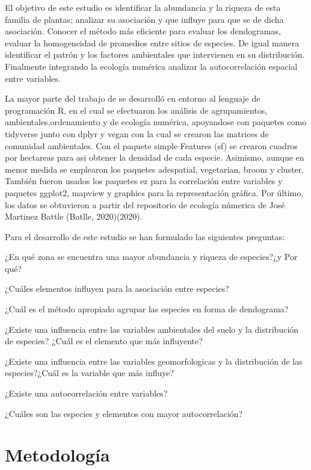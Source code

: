 \documentclass[11pt,]{article}
\begin{document}
El objetivo de este estudio es identificar la abundancia y la riqueza de
esta familia de plantas; analizar su asociación y que influye para que
se de dicha asociación. Conocer el método más eficiente para evaluar los
dendogramas, evaluar la homogeneidad de promedios entre sitios de
especies. De igual manera identificar el patrón y los factores
ambientales que intervienen en su distribución. Finalmente integrando la
ecología numérica analizar la autocorrelación espacial entre variables.

La mayor parte del trabajo de se desarrolló en entorno al lenguaje de
programación R, en el cual se efectuaron los análisis de agrupamientos,
ambientales,ordenamiento y de ecología numérica, apoyandose con paquetes
como tidyverse junto con dplyr y vegan con la cual se crearon las
matrices de comunidad ambientales. Con el paquete simple Features (sf)
se crearon cuadros por hectareas para asi obtener la densidad de cada
especie. Asimismo, aunque en menor medida se emplearon los paquetes
adespatial, vegetarian, broom y cluster. También fueron usados los
paquetes ez para la correlación entre variables y paquetes ggplot2,
mapview y graphics para la representación gráfica. Por último, los datos
se obtuvieron a partir del repositorio de ecología númerica de José
Martinez Battle (Batlle, 2020)(2020).

Para el desarrollo de este estudio se han formulado las siguientes
preguntas:

¿En qué zona se encuentra una mayor abundancia y riqueza de especies?¿y
Por qué?

¿Cuáles elementos influyen para la asociación entre especies?

¿Cuál es el método apropiado agrupar las especies en forma de
dendograma?

¿Existe una influencia entre las variables ambientales del suelo y la
distribución de especies? ¿Cuál es el elemento que más influyente?

¿Existe una influencia entre las variables geomorfologicas y la
distribución de las especies?¿Cuál es la variable que más influye?

¿Existe una autocorrelación entre variables?

¿Cuáles son las especies y elementos con mayor autocorrelación?

\section{Metodología}\label{metodologuxeda}
\end{document}
